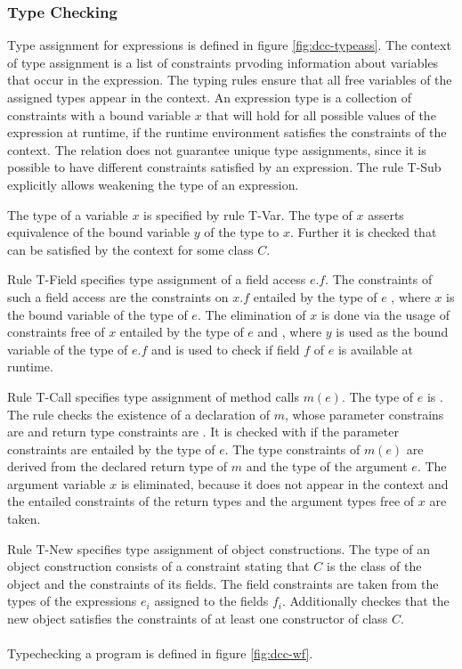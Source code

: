 \subsubsection{Type Checking}
Type assignment for expressions is defined in figure \ref{fig:dcc-typeass}.
The context of type assignment is a list of constraints prvoding information
about variables that occur in the expression.
The typing rules ensure that all free variables of the assigned types
appear in the context.
An expression type  is a collection of constraints 
with a bound variable $x$
that will hold for all possible values of the expression at runtime,
if the runtime environment satisfies the constraints of the context.
The relation does not guarantee unique type assignments,
since it is possible to have different constraints satisfied by an expression.
The rule T-Sub explicitly allows weakening the type of an expression.

The type of a variable $x$ is specified by rule T-Var.
The type of $x$ asserts equivalence of the bound variable $y$ of the type to $x$.
Further it is checked that  can be satisfied by the context for some class $C$.

Rule T-Field specifies type assignment of a field access $e.f$.
The constraints of such a field access are the constraints on $x.f$
entailed by the type of $e$
, where $x$ is the bound variable of the type of $e$.
The elimination of $x$ is done via the usage of
constraints free of $x$ entailed by the type of $e$ and ,
where $y$ is used as the bound variable of the type of $e.f$
and  is used to check if
field $f$ of $e$ is available at runtime.

Rule T-Call specifies type assignment of method calls $m(e)$.
The type of $e$ is .
The rule checks the existence of a declaration of $m$,
whose parameter constrains are  and return type constraints are .
It is checked with  if
the parameter constraints are entailed by the type of $e$.
The type constraints of $m(e)$ are derived from the declared return type of $m$
and the type of the argument $e$.
The argument variable $x$ is eliminated, because it does not appear in the context
and the entailed constraints of the return types and the argument types
free of $x$ are taken.

Rule T-New specifies type assignment of object constructions.
The type  of an object construction 
consists of a constraint stating that $C$ is the class of the object and the constraints of its fields.
The field constraints are taken from the types of the expressions $e_i$
assigned to the fields $f_i$.
Additionally  checkes
that the new object satisfies the constraints of at least
one constructor  of class $C$.
\\
\\
Typechecking a program is defined in figure \ref{fig:dcc-wf}.

